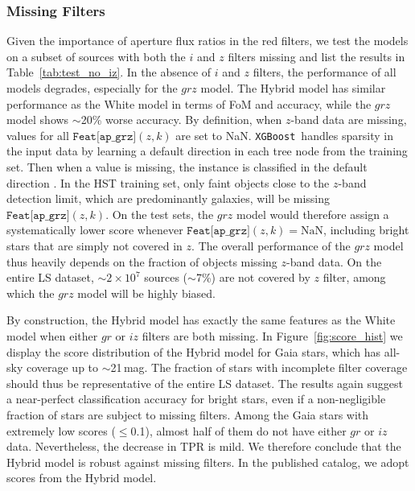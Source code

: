 \documentclass[twocolumn,tighten]{aastex631}
\newcommand{\xgboost}{\texttt{XGBoost}}
\begin{document}
\begin{CJK*}{UTF8}{gbsn}
\subsubsection{Missing Filters}
Given the importance of aperture flux ratios in the red filters, we test the models on a subset of sources with both the $i$ and $z$ filters missing and list the results in Table~\ref{tab:test_no_iz}. In the absence of $i$ and $z$ filters, the performance of all models degrades, especially for the $grz$ model. The Hybrid model has similar performance as the White model in terms of FoM and accuracy, while the $grz$ model shows $\sim$20\% worse accuracy. By definition, when $z$-band data are missing, values for all $\texttt{Feat[ap\_grz]}(z, k)$ are set to NaN. \xgboost\ handles sparsity in the input data by learning a default direction in each tree node from the training set. Then when a value is missing, the instance is classified in the default direction \citep{XGBoost_2016}. In the HST training set, only faint objects close to the $z$-band detection limit, which are predominantly galaxies, will be missing $\texttt{Feat[ap\_grz]}(z, k)$. On the test sets, the $grz$ model would therefore assign a systematically lower score whenever $\texttt{Feat[ap\_grz]}(z, k)=\mathrm{NaN}$, including bright stars that are simply not covered in $z$. The overall performance of the $grz$ model thus heavily depends on the fraction of objects missing $z$-band data. On the entire LS dataset, $\sim$$2\times10^7$ sources ($\sim$7\%) are not covered by $z$ filter, among which the $grz$ model will be highly biased. %

By construction, the Hybrid model has exactly the same features as the White model when either $gr$ or $iz$ filters are both missing. In Figure~\ref{fig:score_hist} we display the score distribution of the Hybrid model for Gaia stars, which has all-sky coverage up to $\sim$21\,mag. The fraction of stars with incomplete filter coverage should thus be representative of the entire LS dataset. The results again suggest a near-perfect classification accuracy for bright stars, even if a non-negligible fraction of stars are subject to missing filters. Among the Gaia stars with extremely low scores ($\le$0.1), almost half of them do not have either $gr$ or $iz$ data. Nevertheless, the decrease in TPR is mild. We therefore conclude that the Hybrid model is robust against missing filters. In the published catalog, we adopt scores from the Hybrid model.


\end{CJK*}
\end{document}
